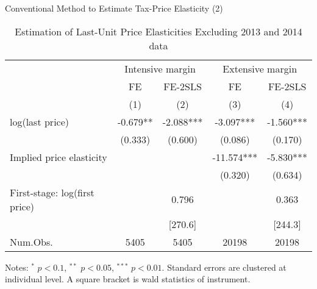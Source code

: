\documentclass[
  ignorenonframetext,
  aspectratio=169,
]{beamer}
\begin{document}
\begin{frame}{Conventional Method to Estimate Tax-Price Elasticity (2)}
\protect\hypertarget{conventional-method-to-estimate-tax-price-elasticity-2}{}
\begin{table}

\caption{\label{tab:WoAnnoucementElasticity}Estimation of Last-Unit Price Elasticities Excluding 2013 and 2014 data}
\centering
\fontsize{7}{9}\selectfont
\begin{threeparttable}
\begin{tabular}[t]{lcccc}
\toprule
\multicolumn{1}{c}{ } & \multicolumn{2}{c}{Intensive margin} & \multicolumn{2}{c}{Extensive margin} \\
\cmidrule(l{3pt}r{3pt}){2-3} \cmidrule(l{3pt}r{3pt}){4-5}
\multicolumn{1}{c}{ } & \multicolumn{1}{c}{FE} & \multicolumn{1}{c}{FE-2SLS} & \multicolumn{1}{c}{FE} & \multicolumn{1}{c}{FE-2SLS} \\
\cmidrule(l{3pt}r{3pt}){2-2} \cmidrule(l{3pt}r{3pt}){3-3} \cmidrule(l{3pt}r{3pt}){4-4} \cmidrule(l{3pt}r{3pt}){5-5}
  & (1) & (2) & (3) & (4)\\
\midrule
log(last price) & -0.679** & -2.088*** & -3.097*** & -1.560***\\
 & (0.333) & (0.600) & (0.086) & (0.170)\\
\midrule
Implied price elasticity &  &  & -11.574*** & -5.830***\\
 &  &  & (0.320) & (0.634)\\
First-stage: log(first price) &  & 0.796 &  & 0.363\\
 &  & [270.6] &  & [244.3]\\
Num.Obs. & 5405 & 5405 & 20198 & 20198\\
\bottomrule
\end{tabular}
\begin{tablenotes}
\item Notes: $^{*}$ $p < 0.1$, $^{**}$ $p < 0.05$, $^{***}$ $p < 0.01$. Standard errors are clustered at individual level. A square bracket is wald statistics of instrument.
\end{tablenotes}
\end{threeparttable}
\end{table}
\end{frame}
\end{document}
